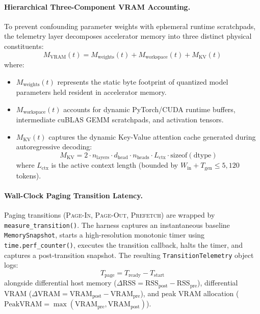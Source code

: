 \paragraph{Hierarchical Three-Component VRAM Accounting.}
To prevent confounding parameter weights with ephemeral runtime scratchpads, the telemetry layer decomposes accelerator memory into three distinct physical constituents:
\begin{equation}
M_{\text{VRAM}}(t) = M_{\text{weights}}(t) + M_{\text{workspace}}(t) + M_{\text{KV}}(t)
\end{equation}
where:
\begin{itemize}
    \item $M_{\text{weights}}(t)$ represents the static byte footprint of quantized model parameters held resident in accelerator memory.
    \item $M_{\text{workspace}}(t)$ accounts for dynamic PyTorch/CUDA runtime buffers, intermediate cuBLAS GEMM scratchpads, and activation tensors.
    \item $M_{\text{KV}}(t)$ captures the dynamic Key-Value attention cache generated during autoregressive decoding:
    \begin{equation}
    M_{\text{KV}} = 2 \cdot n_{\text{layers}} \cdot d_{\text{head}} \cdot n_{\text{heads}} \cdot L_{\text{ctx}} \cdot \text{sizeof}(\text{dtype})
    \end{equation}
    where $L_{\text{ctx}}$ is the active context length (bounded by $W_{\text{in}} + T_{\text{gen}} \le 5,120$ tokens).
\end{itemize}

\paragraph{Wall-Clock Paging Transition Latency.}
Paging transitions (\textsc{Page-In}, \textsc{Page-Out}, \textsc{Prefetch}) are wrapped by \texttt{measure\_transition()}. The harness captures an instantaneous baseline \texttt{MemorySnapshot}, starts a high-resolution monotonic timer using \texttt{time.perf\_counter()}, executes the transition callback, halts the timer, and captures a post-transition snapshot. The resulting \texttt{TransitionTelemetry} object logs:
\begin{equation}
T_{\text{page}} = T_{\text{ready}} - T_{\text{start}}
\end{equation}
alongside differential host memory ($\Delta \text{RSS} = \text{RSS}_{\text{post}} - \text{RSS}_{\text{pre}}$), differential VRAM ($\Delta \text{VRAM} = \text{VRAM}_{\text{post}} - \text{VRAM}_{\text{pre}}$), and peak VRAM allocation ($\text{PeakVRAM} = \max(\text{VRAM}_{\text{pre}}, \text{VRAM}_{\text{post}})$).

